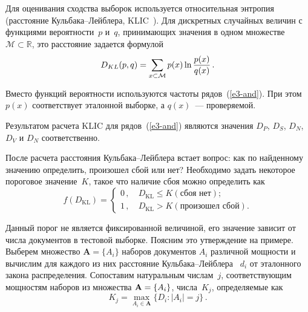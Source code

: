 \begin{multicols}{2}
    \begin{figure*}[b]
  \begin{minipage}[t]{82mm}
    \vspace*{1pt}
  \begin{center}  %
\mbox{%
 \epsfxsize=78.994mm
 }
 \end{center}
 \vspace*{-9pt}
\end{minipage}
\hfill
\begin{minipage}[t]{82mm}
\vspace*{1pt}
\begin{center}
 \mbox{%
 \epsfxsize=78.994mm
 }
 \end{center}
 \vspace*{-9pt}
 \end{minipage}
\end{figure*}

  Для оценивания сходства выборок используется относительная энтропия 
(расстояние Куль\-ба\-ка--Лейб\-ле\-ра, KLIC~\cite{20-and}). Для дискретных 
случайных величин с функциями вероятности~$p$ и~$q$, принимающих 
значения в одном множестве $\mathcal{M}\subset \mathbb{R}$, это расстояние 
задается формулой 
  $$
  D_{KL}(p,q) =\sum\limits_{x\subset \mathcal{M}} p(x) \ln \displaystyle\frac{\displaystyle p(x)\mathstrut}{\displaystyle q(x)\mathstrut}\,.
  $$
  

  
    Вместо функций вероятности используются час\-то\-ты рядов~(\ref{e3-and}). 
При этом $p(x)$ соответствует эталонной выборке, а $q(x)$~--- проверяемой. 
  
    Результатом расчета KLIC для рядов~(\ref{e3-and}) являются значения 
$D_P$, $D_S$, $D_N$, $D_V$ и $D_N$ соответственно.
  
    После расчета расстояния Куль\-ба\-ка--Лейб\-ле\-ра встает вопрос: как по 
найденному значению определить, произошел сбой или нет? Необходимо 
задать некоторое пороговое значение~$K$, такое что наличие сбоя можно 
определить как
  $$
  f(D_{\mathrm{KL}} ) = 
  \begin{cases}
  0\,, &\ D_{\mathrm{KL}}\leq K (\mbox{сбоя нет});\\
  1\,, &\ D_{\mathrm{KL}}>K (\mbox{произошел сбой}).
  \end{cases}
  $$
  
  Данный порог не является фиксированной величиной, его значение зависит 
от числа документов в тестовой выборке. Поясним это утверждение на 
примере. Выберем множество $\mathbf{A}=\{A_i\}$ наборов документов $A_i$ 
различной мощности и вычислим для каждого из них расстояние 
  Куль\-ба\-ка--Лейб\-ле\-ра ~$d_i$ 
  от эталонного закона распределения. Сопоставим натуральным числам~$j$, 
соответствующим мощностям наборов из множества $\mathbf{A}\hm=\{A_i\}$, 
числа~$K_j$, определяемые как
  $$
  K_j=\max\limits_{A_i\in \mathbf{A}}\{ D_i:\vert A_i\vert=j\}\,.
  $$
  

\end{multicols}
